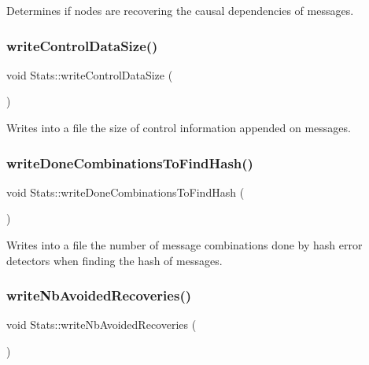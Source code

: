 Determines if nodes are recovering the causal dependencies of messages. 

\mbox{\label{class_stats_a49086baebc806841600c8545b5315149}} 
\subsubsection{\texorpdfstring{write\+Control\+Data\+Size()}{writeControlDataSize()}}
{\footnotesize\ttfamily void Stats\+::write\+Control\+Data\+Size (\begin{DoxyParamCaption}{ }\end{DoxyParamCaption})\hspace{0.3cm}{\ttfamily [private]}}



Writes into a file the size of control information appended on messages. 

\mbox{\label{class_stats_a73a83aa6b190ceb71e8ed2b131338d81}} 
\subsubsection{\texorpdfstring{write\+Done\+Combinations\+To\+Find\+Hash()}{writeDoneCombinationsToFindHash()}}
{\footnotesize\ttfamily void Stats\+::write\+Done\+Combinations\+To\+Find\+Hash (\begin{DoxyParamCaption}{ }\end{DoxyParamCaption})\hspace{0.3cm}{\ttfamily [private]}}



Writes into a file the number of message combinations done by hash error detectors when finding the hash of messages. 

\mbox{\label{class_stats_ac6a0fdf44cc2a3dc11ff22eb75faacf2}} 
\subsubsection{\texorpdfstring{write\+Nb\+Avoided\+Recoveries()}{writeNbAvoidedRecoveries()}}
{\footnotesize\ttfamily void Stats\+::write\+Nb\+Avoided\+Recoveries (\begin{DoxyParamCaption}{ }\end{DoxyParamCaption})\hspace{0.3cm}{\ttfamily [private]}}



